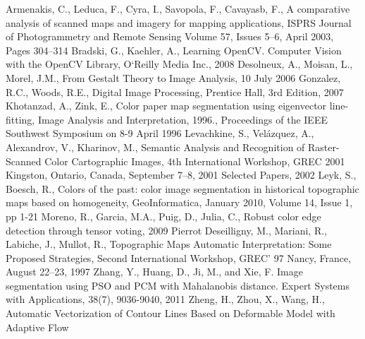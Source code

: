 \documentclass[a4paper,onecolumn,oneside,12pt]{memoir}
\begin{document}
\newpage

\renewcommand\bibname{References}

\begin{thebibliography}{99}
          {Armenakis, C., Leduca, F., Cyra, I., Savopola, F., Cavayasb, F.,
          A comparative analysis of scanned maps and imagery for mapping applications,
          ISPRS Journal of Photogrammetry and Remote Sensing Volume 57, Issues 5–6, April 2003,
          Pages 304–314}
          {Bradski, G., Kaehler, A.,
          Learning OpenCV. Computer Vision with the OpenCV Library,
          O`Reilly Media Inc., 2008}
          {Desolneux, A., Moisan, L., Morel, J.M.,
          From Gestalt Theory to Image Analysis, 
          10 July 2006}
          {Gonzalez, R.C., Woods, R.E.,
          Digital Image Processing, Prentice Hall, 3rd Edition, 2007}
          {Khotanzad, A., Zink, E., Color paper map segmentation using eigenvector line-fitting,
          Image Analysis and Interpretation, 1996., Proceedings of the IEEE Southwest Symposium on
          8-9 April 1996}
          {Levachkine, S., Velázquez, A., Alexandrov, V., Kharinov, M.,
          Semantic Analysis and Recognition of Raster-Scanned Color Cartographic Images,
          4th International Workshop, GREC 2001 Kingston, Ontario, Canada, September 7–8, 
          2001 Selected Papers, 2002}
          {Leyk, S., Boesch, R.,
          Colors of the past: color image segmentation in historical topographic maps based on
          homogeneity, GeoInformatica, January 2010, Volume 14, Issue 1, pp 1-21 }
          {Moreno, R., Garcia, M.A., Puig, D., Julia, C.,
          Robust color edge detection through tensor voting, 2009 }
          {Pierrot Deseilligny, M., Mariani, R., Labiche, J., Mullot, R.,
          Topographic Maps Automatic Interpretation: Some Proposed Strategies,
          Second International Workshop, GREC' 97 Nancy, France, August 22–23, 1997}
          {Zhang, Y., Huang, D., Ji, M., and Xie, F.
          Image segmentation using PSO and PCM with Mahalanobis distance. Expert Systems with
          Applications, 38(7), 9036-9040, 2011}
          {Zheng, H., Zhou, X., Wang, H.,
          Automatic Vectorization of Contour Lines Based on Deformable Model with Adaptive Flow
}
\end{thebibliography}
\end{document}

